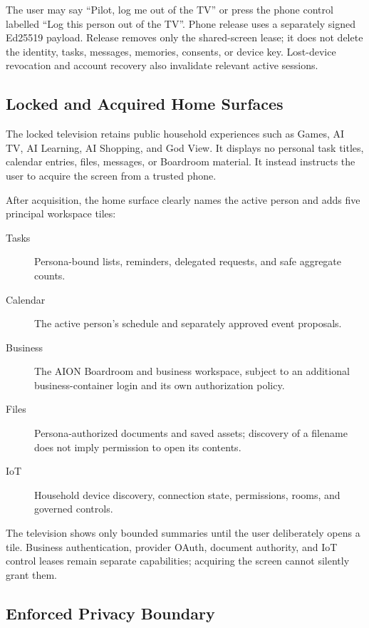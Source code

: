 The user may say ``Pilot, log me out of the TV'' or press the phone control
labelled ``Log this person out of the TV''.  Phone release uses a separately
signed Ed25519 payload.  Release removes only the shared-screen lease; it does
not delete the identity, tasks, messages, memories, consents, or device key.
Lost-device revocation and account recovery also invalidate relevant active
sessions.

\subsection{Locked and Acquired Home Surfaces}

The locked television retains public household experiences such as Games, AI
TV, AI Learning, AI Shopping, and God View.  It displays no personal task
titles, calendar entries, files, messages, or Boardroom material.  It instead
instructs the user to acquire the screen from a trusted phone.

After acquisition, the home surface clearly names the active person and adds
five principal workspace tiles:

\begin{description}
  \item[Tasks] Persona-bound lists, reminders, delegated requests, and safe
  aggregate counts.
  \item[Calendar] The active person's schedule and separately approved event
  proposals.
  \item[Business] The AION Boardroom and business workspace, subject to an
  additional business-container login and its own authorization policy.
  \item[Files] Persona-authorized documents and saved assets; discovery of a
  filename does not imply permission to open its contents.
  \item[IoT] Household device discovery, connection state, permissions, rooms,
  and governed controls.
\end{description}

The television shows only bounded summaries until the user deliberately opens
a tile.  Business authentication, provider OAuth, document authority, and IoT
control leases remain separate capabilities; acquiring the screen cannot
silently grant them.

\subsection{Enforced Privacy Boundary}

